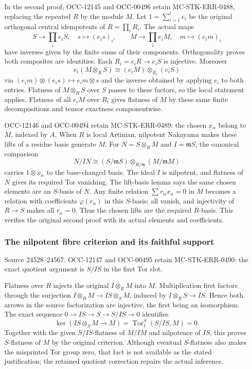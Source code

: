 In the second proof, OCC-12145 and OCC-00496 retain MC-STK-ERR-0488, replacing the repeated \(R\) by the module \(M\). Let \(1=\sum_{i=1}^t e_i\) be the original orthogonal central idempotents of \(R=\prod_i R_i\). The actual maps \[
S\longrightarrow\prod_i e_iS,\quad s\longmapsto(e_is)_i,
\qquad
M\longrightarrow\prod_i e_iM,\quad m\longmapsto(e_im)_i
\] have inverses given by the finite sums of their components. Orthogonality proves both composites are identities. Each \(R_i=e_iR\to e_iS\) is injective. Moreover \[
e_i(M\otimes_RS)\cong(e_iM)\otimes_{R_i}(e_iS)
\] via \((e_im)\otimes(e_is)\mapsto e_im\otimes s\) and the inverse obtained by applying \(e_i\) to both entries. Flatness of \(M\otimes_RS\) over \(S\) passes to these factors, so the local statement applies. Flatness of all \(e_iM\) over \(R_i\) gives flatness of \(M\) by these same finite decompositions and tensor exactness componentwise.

OCC-12146 and OCC-00494 retain MC-STK-ERR-0489: the chosen \(x_\alpha\) belong to \(M\), indexed by \(A\). When \(R\) is local Artinian, nilpotent Nakayama makes these lifts of a residue basis generate \(M\). For \(N=S\otimes_RM\) and \(I=\mathfrak mS\), the canonical comparison \[
N/IN\cong(S/\mathfrak mS)\otimes_{R/\mathfrak m}(M/\mathfrak mM)
\] carries \(1\otimes x_\alpha\) to the base-changed basis. The ideal \(I\) is nilpotent, and flatness of \(N\) gives its required Tor vanishing. The lift-basis lemma says the same chosen elements are an \(S\)-basis of \(N\). Any finite relation \(\sum r_\alpha x_\alpha=0\) in \(M\) becomes a relation with coefficients \(\varphi(r_\alpha)\) in this \(S\)-basis; all vanish, and injectivity of \(R\to S\) makes all \(r_\alpha=0\). Thus the chosen lifts are the required \(R\)-basis. This verifies the original second proof with its actual elements and coefficients.

\subsubsection{The nilpotent fibre criterion and its faithful support}\label{the-nilpotent-fibre-criterion-and-its-faithful-support}

Source 24528--24567. OCC-12147 and OCC-00495 retain MC-STK-ERR-0490: the exact quotient argument is \(S/IS\) in the first Tor slot.

Flatness over \(R\) injects the original \(I\otimes_RM\) into \(M\). Multiplication first factors through the surjection \(I\otimes_RM\to IS\otimes_SM\), induced by \(I\otimes_RS\to IS\). Hence both arrows in the source factorization are injective, the first being an isomorphism. The exact sequence \(0\to IS\to S\to S/IS\to0\) identifies \[
\ker(IS\otimes_SM\to M)=\operatorname{Tor}_1^S(S/IS,M)=0.
\] Together with the given \(S/IS\)-flatness of \(M/IM\) and nilpotence of \(IS\), this proves \(S\)-flatness of \(M\) by the original criterion. Although eventual \(S\)-flatness also makes the misprinted Tor group zero, that fact is not available as the stated justification; the retained quotient correction repairs the actual inference.


